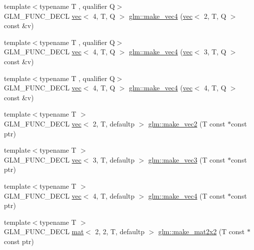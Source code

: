 \begin{DoxyCompactItemize}
\item 
{\footnotesize template$<$typename T , qualifier Q$>$ }\\G\+L\+M\+\_\+\+F\+U\+N\+C\+\_\+\+D\+E\+CL \hyperlink{structglm_1_1vec}{vec}$<$ 4, T, Q $>$ \hyperlink{group__gtc__type__ptr_gaa9bd116caf28196fd1cf00b278286fa7}{glm\+::make\+\_\+vec4} (\hyperlink{structglm_1_1vec}{vec}$<$ 2, T, Q $>$ const \&v)
\item 
{\footnotesize template$<$typename T , qualifier Q$>$ }\\G\+L\+M\+\_\+\+F\+U\+N\+C\+\_\+\+D\+E\+CL \hyperlink{structglm_1_1vec}{vec}$<$ 4, T, Q $>$ \hyperlink{group__gtc__type__ptr_ga4036328ba4702c74cbdfad1fc03d1b8f}{glm\+::make\+\_\+vec4} (\hyperlink{structglm_1_1vec}{vec}$<$ 3, T, Q $>$ const \&v)
\item 
{\footnotesize template$<$typename T , qualifier Q$>$ }\\G\+L\+M\+\_\+\+F\+U\+N\+C\+\_\+\+D\+E\+CL \hyperlink{structglm_1_1vec}{vec}$<$ 4, T, Q $>$ \hyperlink{group__gtc__type__ptr_gaa95cb15732f708f613e65a0578895ae5}{glm\+::make\+\_\+vec4} (\hyperlink{structglm_1_1vec}{vec}$<$ 4, T, Q $>$ const \&v)
\item 
{\footnotesize template$<$typename T $>$ }\\G\+L\+M\+\_\+\+F\+U\+N\+C\+\_\+\+D\+E\+CL \hyperlink{structglm_1_1vec}{vec}$<$ 2, T, defaultp $>$ \hyperlink{group__gtc__type__ptr_ga81253cf7b0ebfbb1e70540c5774e6824}{glm\+::make\+\_\+vec2} (T const $\ast$const ptr)
\item 
{\footnotesize template$<$typename T $>$ }\\G\+L\+M\+\_\+\+F\+U\+N\+C\+\_\+\+D\+E\+CL \hyperlink{structglm_1_1vec}{vec}$<$ 3, T, defaultp $>$ \hyperlink{group__gtc__type__ptr_gad9e0d36ff489cb30c65ad1fa40351651}{glm\+::make\+\_\+vec3} (T const $\ast$const ptr)
\item 
{\footnotesize template$<$typename T $>$ }\\G\+L\+M\+\_\+\+F\+U\+N\+C\+\_\+\+D\+E\+CL \hyperlink{structglm_1_1vec}{vec}$<$ 4, T, defaultp $>$ \hyperlink{group__gtc__type__ptr_ga63f576518993efc22a969f18f80e29bb}{glm\+::make\+\_\+vec4} (T const $\ast$const ptr)
\item 
{\footnotesize template$<$typename T $>$ }\\G\+L\+M\+\_\+\+F\+U\+N\+C\+\_\+\+D\+E\+CL \hyperlink{structglm_1_1mat}{mat}$<$ 2, 2, T, defaultp $>$ \hyperlink{group__gtc__type__ptr_gae49e1c7bcd5abec74d1c34155031f663}{glm\+::make\+\_\+mat2x2} (T const $\ast$const ptr)
\item 

\end{DoxyCompactItemize}
